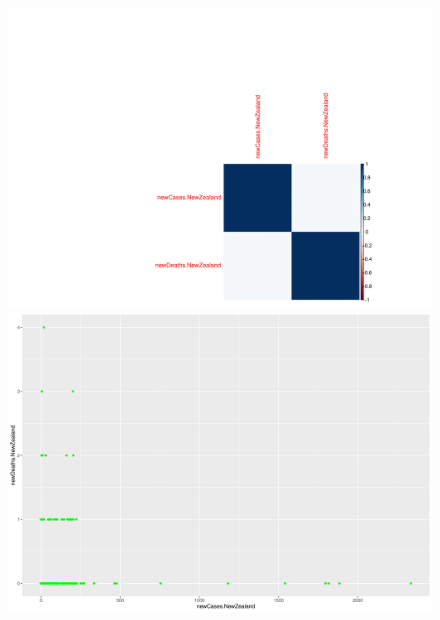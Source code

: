 \documentclass[a4paper]{article}
\theoremstyle{definition}
\begin{document}
\begin{enumerate}[i)]
\begin{enumerate}[1)]
\begin{itemize}
\begin{figure}[h]
      \includegraphics[scale=0.5]{Images/CorrPlotNewZealand.png}
      \includegraphics[scale=0.5]{Images/PlotNewZealand-1.png}
     \end{figure}
\end{itemize}
\end{enumerate}
\end{enumerate}
\end{document}
